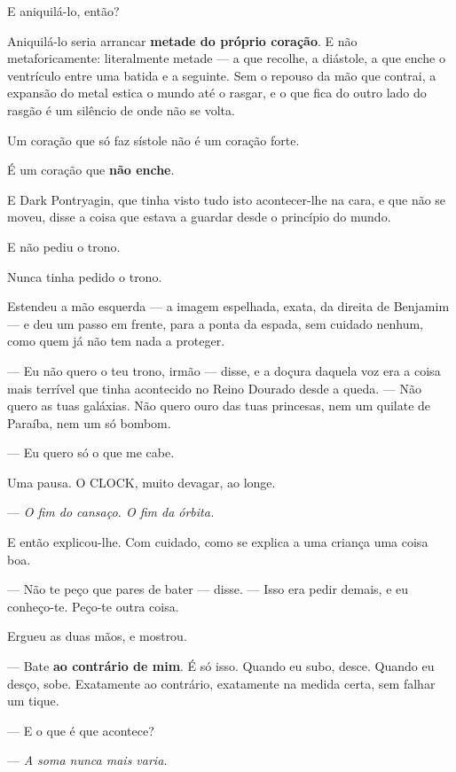 \documentclass[livro.tex]{subfiles}
\begin{document}
\medskip

E aniquilá-lo, então?

Aniquilá-lo seria arrancar \textbf{metade do próprio coração}. E não metaforicamente: literalmente metade --- a que
recolhe, a diástole, a que enche o ventrículo entre uma batida e a seguinte. Sem o repouso da mão que contrai, a
expansão do metal estica o mundo até o rasgar, e o que fica do outro lado do rasgão é um silêncio de onde não
se volta.

Um coração que só faz sístole não é um coração forte.

É um coração que \textbf{não enche}.

\medskip

E Dark Pontryagin, que tinha visto tudo isto acontecer-lhe na cara, e que não se moveu, disse a coisa que estava a
guardar desde o princípio do mundo.

E não pediu o trono.

Nunca tinha pedido o trono.

Estendeu a mão esquerda --- a imagem espelhada, exata, da direita de Benjamim --- e deu um passo em frente, para a
ponta da espada, sem cuidado nenhum, como quem já não tem nada a proteger.

--- Eu não quero o teu trono, irmão --- disse, e a doçura daquela voz era a coisa mais terrível que tinha acontecido
no Reino Dourado desde a queda. --- Não quero as tuas galáxias. Não quero ouro das tuas princesas, nem um quilate de Paraíba, nem um só bombom.

--- Eu quero só o que me cabe.

Uma pausa. O CLOCK, muito devagar, ao longe.

--- \emph{O fim do cansaço. O fim da órbita.}

\medskip

E então explicou-lhe. Com cuidado, como se explica a uma criança uma coisa boa.

--- Não te peço que pares de bater --- disse. --- Isso era pedir demais, e eu conheço-te. Peço-te outra coisa.

Ergueu as duas mãos, e mostrou.

--- Bate \textbf{ao contrário de mim}. É só isso. Quando eu subo, desce. Quando eu desço, sobe. Exatamente ao
contrário, exatamente na medida certa, sem falhar um tique.

--- E o que é que acontece?

--- \emph{A soma nunca mais varia.}

\medskip
\end{document}
